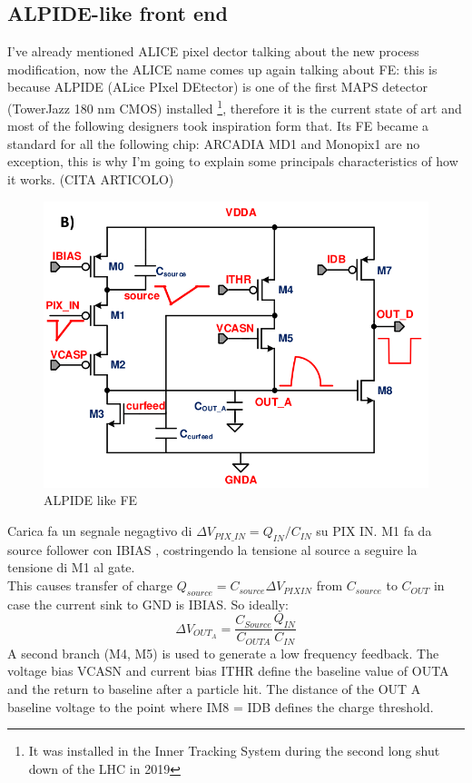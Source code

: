    \subsection{ALPIDE-like front end}
      I've already mentioned ALICE pixel dector talking about the new process modification, now the ALICE name comes up again talking about FE: this is because ALPIDE (ALice PIxel DEtector) is one of the first MAPS detector (TowerJazz 180 nm CMOS) installed \footnote{It was installed in the Inner Tracking System during the second long shut down of the LHC in 2019}, therefore it is the current state of art and most of the following designers took inspiration form that. Its FE became a standard for all the following chip: ARCADIA MD1 and Monopix1 are no exception, this is why I'm going to explain some principals characteristics of how it works. (CITA ARTICOLO)
      \begin{figure}[h!]
         \centering
         \includegraphics[width=.7\linewidth]{figures/Pixel_detectors/ALPIDE_FE.png}
         \caption{ALPIDE like FE}
         \label{fig:ALPIDE-like}
      \end{figure}

      Carica fa un segnale negagtivo di $\Delta V_{PIX\_IN} = Q_{IN}/C_{IN}$ su PIX IN. 
      M1 fa da source follower con IBIAS , costringendo la tensione al source a seguire la tensione di M1
      al gate. \\
      This causes transfer of charge 
      $Q_{source}=C_{source}\Delta V_{PIXIN}$ from $C_{source}$ to $C_{OUT}$ in case the current sink
      to GND is IBIAS.
      So ideally:
      \begin{equation}
         \Delta V_{OUT_A} = \frac{C_{Source}}{C_{OUTA}}\frac{Q_{IN}}{C_{IN}}
      \end{equation}
      A second branch (M4, M5) is used to generate a low frequency feedback. 
      The voltage bias
      VCASN and current bias ITHR define the baseline value of OUTA and the return to baseline after
      a particle hit. The distance of the OUT A baseline voltage to the point where
      IM8 = IDB defines the charge threshold.
      
